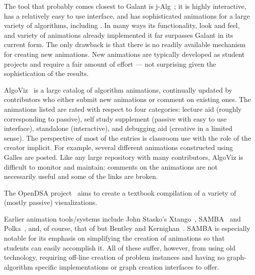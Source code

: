 The tool that probably comes closest to Galant is j-Alg~\cite{j-Alg};
it is highly interactive, has a relatively easy to use interface, and has sophisticated animations for a large variety of algorithms,
including .
In many ways its functionality, look and feel, and variety of animations
already implemented it far surpasses Galant in its current form.
The only drawback is that there is no readily available mechanism
for creating new animations.
New animations are typically developed as
student projects and require a fair amount of effort --- not surprising given
the sophistication of the results.



AlgoViz~\cite{AlgoViz}
is a large catalog of algorithm animations, continually updated by
contributors who either submit new animations or comment on existing ones.
The animations listed are rated with respect to four categories:
lecture aid (roughly corresponding to passive), self study supplement (passive with
easy to use interface),
standalone (interactive),
and debugging aid (creative in a limited sense).
The perspective of most of the entries is classroom use with the role of the
creator implicit.
For example, several different animations constructed using Galles are posted.
Like any large repository with many contributors, AlgoViz is difficult to
monitor and
maintain: comments on the animations are not necessarily useful and some of the links are broken.


The OpenDSA project~\cite{%
2011-ProgramVisualization-Shaffer,2011-Koli-Shaffer,2012-SIGCSE-Fouh%
}
aims to create a textbook compilation of a variety of
(mostly passive) visualizations.

Earlier animation tools/systems include John Stasko's Xtango~\cite{Xtango},
SAMBA~\cite{SAMBA} and Polka~\cite{Polka,1992-TR_GIT-Stasko}, and, of course,
that of but
Bentley and Kernighan~\cite{1987-Animation-Bentley}.
SAMBA is especially notable for its emphasis on simplifying the creation of
animations so that students can easily accomplish it.
All of these suffer, however, from using old technology, requiring off-line creation
of problem instances and having no graph-algorithm specific implementations
or graph creation interfaces to offer.


